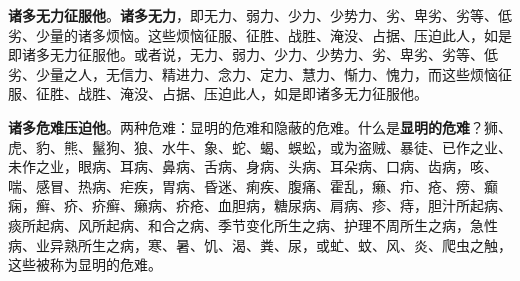 
\textbf{诸多无力征服他}。\textbf{诸多无力}，即无力、弱力、少力、少势力、劣、卑劣、劣等、低劣、少量的诸多烦恼。这些烦恼征服、征胜、战胜、淹没、占据、压迫此人，如是即诸多无力征服他。或者说，无力、弱力、少力、少势力、劣、卑劣、劣等、低劣、少量之人，无信力、精进力、念力、定力、慧力、惭力、愧力，而这些烦恼征服、征胜、战胜、淹没、占据、压迫此人，如是即诸多无力征服他。


\textbf{诸多危难压迫他}。两种危难：显明的危难和隐蔽的危难。什么是\textbf{显明的危难}？狮、虎、豹、熊、鬣狗、狼、水牛、象、蛇、蝎、蜈蚣，或为盗贼、暴徒、已作之业、未作之业，眼病、耳病、鼻病、舌病、身病、头病、耳朵病、口病、齿病，咳、喘、感冒、热病、疟疾，胃病、昏迷、痢疾、腹痛、霍乱，癞、疖、疮、痨、癫痫，癣、疥、疥癣、癞病、疥疮、血胆病，糖尿病、肩病、疹、痔，胆汁所起病、痰所起病、风所起病、和合之病、季节变化所生之病、护理不周所生之病，急性病、业异熟所生之病，寒、暑、饥、渴、粪、尿，或虻、蚊、风、炎、爬虫之触，这些被称为显明的危难。


